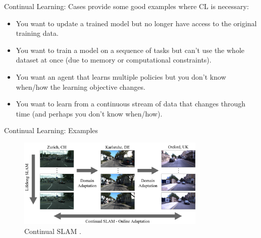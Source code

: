 \documentclass[12pt,aspectratio=169, handout]{beamer}
\let\olditem\item
\renewcommand\item{\olditem\justifying}
\begin{document}
\begin{frame}{Continual Learning: Cases}
    \cite{lesort_continual_2019} provide some good examples where CL is necessary:
        \begin{itemize}[<+->]
            \item You want to update a trained model but no longer have access to the original training data.
            \item You want to train a model on a sequence of tasks but can't use the whole dataset at once (due to memory or computational constraints).
            \item You want an agent that learns multiple policies but you don't know when/how the learning objective changes.
            \item You want to learn from a continuous stream of data that changes through time (and perhaps you don't know when/how).
        \end{itemize}
    
\end{frame}

\begin{frame}{Continual Learning: Examples}

\begin{figure}
    \centering
    \begin{center}
        \hspace*{1cm}\includegraphics[width=0.8\textwidth]{"images/continual_slam.png"}
        \caption{Continual SLAM \parencite{vodisch_continual_2023}.}
    \end{center}
\end{figure}
    
\end{frame}
\end{document}
